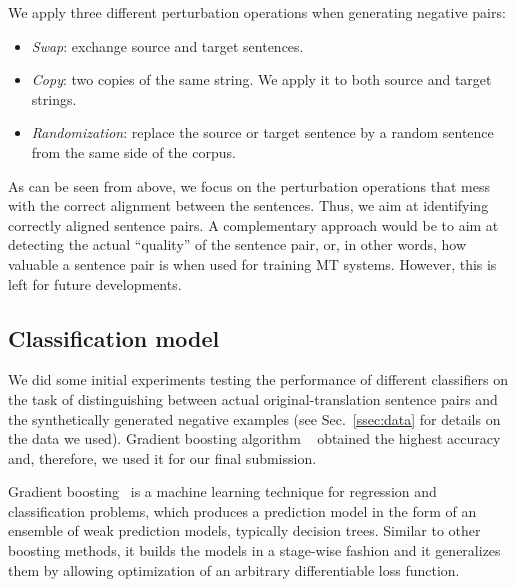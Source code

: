 We apply three different perturbation operations when generating negative pairs:
\begin{itemize}
\item \textit{Swap}: exchange source and target sentences.
\item \textit{Copy}: two copies of the same string. We apply it to both source and target strings.
\item \textit{Randomization}: replace the source or target sentence by a random sentence from the same side of the corpus.
\end{itemize}

As can be seen from above, we focus on the perturbation operations that mess with the correct alignment between the sentences. Thus, we aim at identifying correctly aligned sentence pairs. A complementary approach would be to aim at detecting the actual ``quality'' of the sentence pair, or, in other words, how valuable a sentence pair is when used for training MT systems. However, this is left for future developments.


\subsection{Classification model}
\label{ssec:model}

We did some initial experiments testing the performance of different classifiers on the task of distinguishing between actual original-translation sentence pairs and the synthetically generated negative examples (see Sec.~\ref{ssec:data} for details on the data we used). Gradient boosting algorithm ~\cite{Friedman02} obtained the highest accuracy and, therefore, we used it for our final submission.

Gradient boosting~\cite{GradientBoosting} is a machine learning technique for regression and classification problems, which produces a prediction model in the form of an ensemble of weak prediction models, typically decision trees. Similar to other boosting methods, it builds the models in a stage-wise fashion and it generalizes them by allowing optimization of an arbitrary differentiable loss function.
